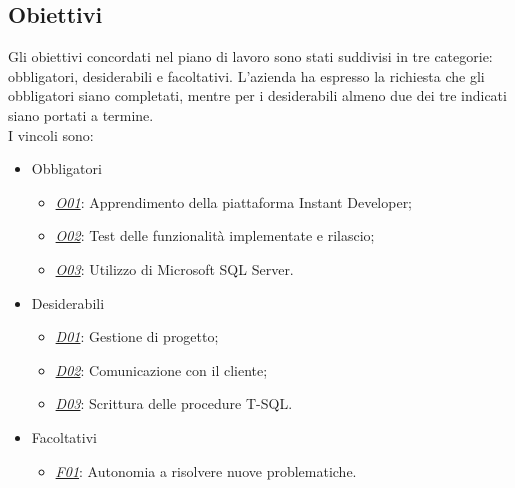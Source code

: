 
\subsection{Obiettivi}
Gli obiettivi concordati nel piano di lavoro sono stati suddivisi in tre categorie: obbligatori, desiderabili e facoltativi. L'azienda ha espresso la richiesta che gli obbligatori siano completati, mentre per i desiderabili almeno due dei tre indicati siano portati a termine. \\
 
I vincoli sono:
\begin{itemize}
	\item Obbligatori
	\begin{itemize}
		\item \underline{\textit{O01}}: Apprendimento della piattaforma Instant Developer;
		\item \underline{\textit{O02}}: Test delle funzionalità implementate e rilascio;
		\item \underline{\textit{O03}}: Utilizzo di Microsoft SQL Server.
	\end{itemize}
	
	\item Desiderabili 
	\begin{itemize}
		\item \underline{\textit{D01}}: Gestione di progetto;
		\item \underline{\textit{D02}}: Comunicazione con il cliente;
		\item \underline{\textit{D03}}: Scrittura delle procedure T-SQL.
	\end{itemize}
	
	\item Facoltativi
	\begin{itemize}
		\item \underline{\textit{F01}}: Autonomia a risolvere nuove problematiche.
	\end{itemize} 
\end{itemize}


